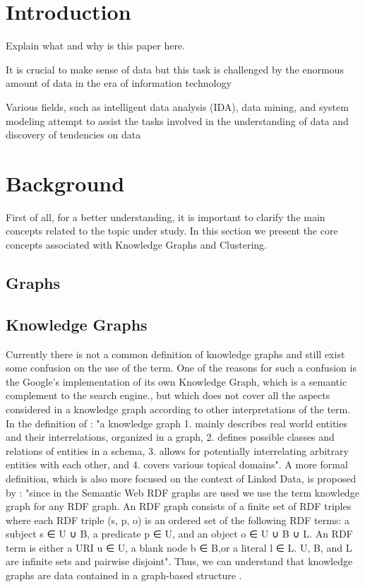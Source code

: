 \documentclass[runningheads]{llncs}
\begin{document}
\section{Introduction}
Explain what and why is this paper here.

It is crucial to make sense of data but this task is challenged by the enormous amount of data in the era of information technology \cite{Pedrycz}

Various fields, such as intelligent data analysis (IDA), data mining, and system modeling attempt to assist the tasks involved in the understanding of data and discovery of tendencies on data \cite{Pedrycz}


\section{Background}
First of all, for a better understanding, it is important to clarify the main concepts related to the topic under study. In this section we present the core concepts associated with Knowledge Graphs and Clustering.
\subsection{Graphs}
\subsection{Knowledge Graphs}
Currently there is not a common definition of knowledge graphs and still exist some confusion on the use of the term. One of the reasons for such a confusion is the Google's implementation of its own Knowledge Graph, which is a semantic complement to the search engine.\cite{Ehrlinger}, but which does not cover all the aspects considered in a knowledge graph according to other interpretations of the term.
In the definition of \cite{Paulheim}: "a knowledge graph
1. mainly describes real world entities and their interrelations, organized in a graph, 2. defines possible classes and relations of entities in a schema, 3. allows for potentially interrelating arbitrary entities with each other, and 4. covers various topical domains". A more formal definition, which is also more focused on the context of Linked Data, is proposed by \cite{Farber}: "since in the Semantic Web RDF graphs are used we use the term knowledge graph for any RDF graph. An RDF graph consists of a finite set of RDF triples where each RDF triple (s, p, o) is an ordered set of the following RDF terms: a subject s ∈ U ∪ B, a predicate p ∈ U, and an object o ∈ U ∪ B ∪ L. An RDF term is either a URI u ∈ U, a blank node b ∈ B,or a literal l ∈ L. U, B, and L are infinite sets and pairwise disjoint".
Thus, we can understand that knowledge graphs are data contained in a graph-based structure \cite{Ehrlinger}.
\end{document}
